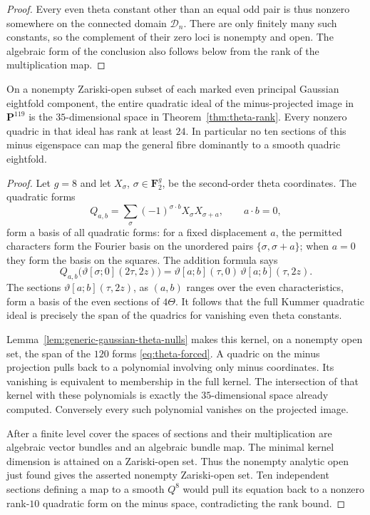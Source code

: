 \begin{proof}
Every even theta constant other than an equal odd pair is thus
nonzero somewhere on the connected domain $\mathcal D_n$.
There are only finitely many such constants, so the complement
of their zero loci is nonempty and open. The algebraic form of
the conclusion also follows below from the rank of the
multiplication map.
\end{proof}

\begin{corollary}\label{cor:all-eightfold-quadrics}
On a nonempty Zariski-open subset of each marked even principal
Gaussian eightfold component, the entire quadratic ideal of the
minus-projected image in $\mathbf P^{119}$ is the
$35$-dimensional space in Theorem~\ref{thm:theta-rank}.
Every nonzero quadric in that ideal has rank at least $24$.
In particular no ten sections of this minus eigenspace can map
the general fibre dominantly to a smooth quadric eightfold.
\end{corollary}

\begin{proof}
Let $g=8$ and let $X_\sigma$, $\sigma\in\mathbf F_2^g$, be the
second-order theta coordinates. The quadratic forms
\[
 Q_{a,b}=\sum_\sigma(-1)^{\sigma\cdot b}
                 X_\sigma X_{\sigma+a},
 \qquad a\cdot b=0,
\]
form a basis of all quadratic forms: for a fixed displacement $a$,
the permitted characters form the Fourier basis on the unordered
pairs $\{\sigma,\sigma+a\}$; when $a=0$ they form the basis on
the squares. The addition formula
\cite[\S3.5, pp.~622--623]{vG96} says
\[
 Q_{a,b}\bigl(\vartheta[\sigma;0](2\tau,2z)\bigr)
 =\vartheta[a;b](\tau,0)\,\vartheta[a;b](\tau,2z).
\]
The sections $\vartheta[a;b](\tau,2z)$, as $(a,b)$ ranges over the
even characteristics, form a basis of the even sections of $4\Theta$.
It follows that the full Kummer quadratic ideal is precisely the
span of the quadrics for vanishing even theta constants.

Lemma~\ref{lem:generic-gaussian-theta-nulls} makes this kernel,
on a nonempty open set, the span of the $120$ forms
\eqref{eq:theta-forced}. A quadric on the minus projection
pulls back to a polynomial involving only minus coordinates.
Its vanishing is equivalent to membership in the full kernel.
The intersection of that kernel with these polynomials is
exactly the $35$-dimensional space already computed.
Conversely every such polynomial vanishes on the projected image.

After a finite level cover the spaces of sections and their
multiplication are algebraic vector bundles and an algebraic
bundle map. The minimal kernel dimension is attained on a
Zariski-open set. Thus the nonempty analytic open just found
gives the asserted nonempty Zariski-open set.
Ten independent sections defining a map to a smooth $Q^8$
would pull its equation back to a nonzero rank-$10$ quadratic
form on the minus space, contradicting the rank bound.
\end{proof}

